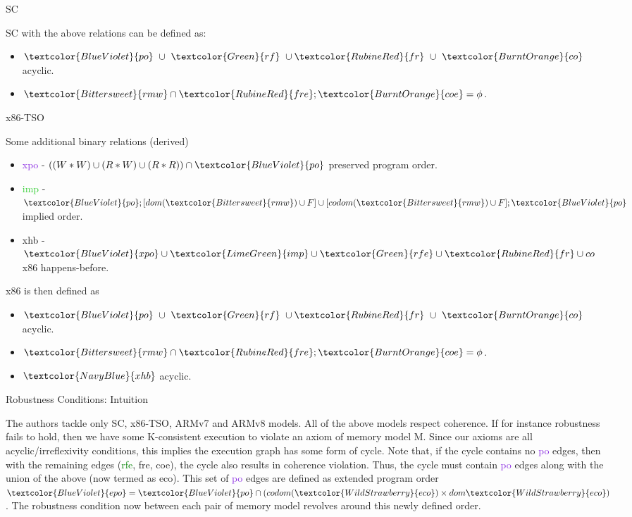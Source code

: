 \documentclass[notes, xcolor=dvipsnames]{beamer}
\newcommand{\po}{\textcolor{BlueViolet}{po}}
\newcommand{\epo}{\textcolor{BlueViolet}{epo}}
\newcommand{\xpo}{\textcolor{BlueViolet}{xpo}}
\newcommand{\rf}{\textcolor{Green}{rf}}
\newcommand{\co}{\textcolor{BurntOrange}{co}}
\newcommand{\coe}{\textcolor{BurntOrange}{coe}}
\newcommand{\fr}{\textcolor{RubineRed}{fr}}
\newcommand{\fre}{\textcolor{RubineRed}{fre}}
\newcommand{\xhb}{\textcolor{NavyBlue}{xhb}}
\newcommand{\rfe}{\textcolor{Green}{rfe}}
\newcommand{\eco}{\textcolor{WildStrawberry}{eco}}
\newcommand{\rmw}{\textcolor{Bittersweet}{rmw}}
\newcommand{\imp}{\textcolor{LimeGreen}{imp}}
\begin{document}
    \begin{frame}{SC}

        SC with the above relations can be defined as:
        \begin{itemize}
            \item $\po \ \cup \ \rf \ \cup \fr \ \cup \ \co$ acyclic.
            \item $\rmw \cap \fre;\coe = \phi$.
        \end{itemize}

    \end{frame}

    \begin{frame}{x86-TSO}

        Some additional binary relations (derived)
        \begin{itemize}
            \item {\xpo} - $((W * W) \cup (R * W) \cup (R * R)) \cap \po$ preserved program order.
            \item {\imp} - $\po;[dom(\rmw) \cup F] \cup [codom(\rmw) \cup F];\po$ implied order.
            \item {\xhb} - $\xpo \cup \imp \cup \rfe \cup \fr \cup co$ x86 happens-before.
        \end{itemize}

        x86 is then defined as 
        \begin{itemize}
            \item $\po \ \cup \ \rf \ \cup \fr \ \cup \ \co$ acyclic.
            \item $\rmw \cap \fre;\coe = \phi$.
            \item $\xhb$ acyclic.
        \end{itemize}

    \end{frame}
    

    \begin{frame}{Robustness Conditions: Intuition}

        The authors tackle only SC, x86-TSO, ARMv7 and ARMv8 models.
        All of the above models respect coherence. 
        If for instance robustness fails to hold, then we have some K-consistent execution to violate an axiom of memory model M.
        Since our axioms are all acyclic/irreflexivity conditions, this implies the execution graph has some form of cycle. 
        Note that, if the cycle contains no {\po} edges, then with the remaining edges ({\rfe}, {\fre}, {\coe}), the cycle also results in coherence violation.
        Thus, the cycle must contain {\po} edges along with the union of the above (now termed as {\eco}).
        This set of {\po} edges are defined as extended program order $\epo = \po \cap (codom(\eco) \times dom{\eco})$. 
        The robustness condition now between each pair of memory model revolves around this newly defined order. 

    \end{frame}
\end{document}

